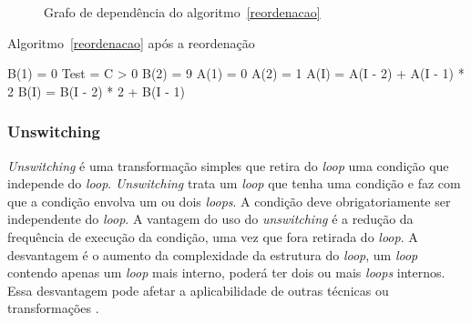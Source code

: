 \begin{figure}
\centering
\label{graph_statement_reordering}
\caption{Grafo de dependência do algoritmo~\ref{reordenacao}}
\end{figure}

\begin{algorithm}
\caption{Algoritmo~\ref{reordenacao} após a reordenação}
\label{reordenado}
\begin{algorithmic}[1]

\STATE B(1) = 0
\STATE Test = C > 0
 \STATE B(2) = 9 \ENDIF
\STATE A(1) = 0
 \STATE A(2) = 1 \ENDIF
{}
\STATE A(I) = A(I - 2) + A(I - 1) * 2
\STATE B(I) = B(I - 2) * 2 + B(I - 1) 
\ENDFOR

\end{algorithmic}
\end{algorithm}


\subsubsection{Unswitching}

\textit{Unswitching} é uma transformação simples que retira do \textit{loop} 
uma condição que independe do \textit{loop}. 
\textit{Unswitching} trata um \textit{loop} que tenha uma condição e faz com 
que a condição envolva um ou dois \textit{loops}. 
A condição deve obrigatoriamente ser independente do \textit{loop}.
A vantagem do uso do \textit{unswitching} é a redução da frequência de execução da 
condição, uma vez que fora retirada do \textit{loop}. 
A desvantagem é o aumento da complexidade da estrutura do \textit{loop}, 
um \textit{loop} contendo apenas um \textit{loop} mais interno,
poderá ter dois ou mais \textit{loops} internos. 
Essa desvantagem pode afetar a aplicabilidade de outras técnicas ou
transformações \cite{Ghodrat:2008} \cite{Yang:2002}.

